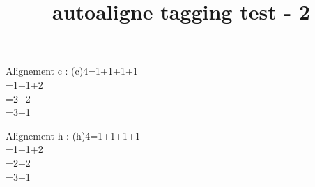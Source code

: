 \documentclass{article}
\title{autoaligne tagging test - 2}
\begin{document}
Alignement c :
\autoaligne(c){4=1+1+1+1\\=1+1+2\\=2+2\\=3+1}\medbreak

Alignement h :
\autoaligne(h){4=1+1+1+1\\=1+1+2\\=2+2\\=3+1}\medbreak

\end{document}
